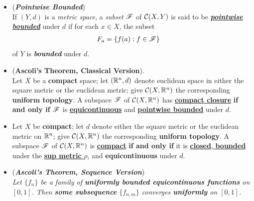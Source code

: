 \documentclass[11pt]{article}
\begin{document}
\begin{itemize}
\item \begin{definition} (\emph{\textbf{Pointwise Bounded}})\\
If $(Y, d)$ is a \emph{metric space}, a \emph{subset} ${\mathscr F}$ of ${\mathcal C}(X, Y)$ is said to be \underline{\emph{\textbf{pointwise bounded}}} under $d$ if for each $x \in X$, the subset
\begin{align*}
F_{a} &= \left\{f(a): f\in {\mathscr F}\right\}
\end{align*}
of $Y$ is \emph{\textbf{bounded}} under $d$.
\end{definition}

\item \begin{theorem} (\textbf{Ascoli's Theorem, Classical Version}). \citep{munkres2000topology}\\
Let $X$ be a \textbf{compact} space; let $({\mathbb R}^n , d)$ denote euclidean space in either the square metric or the euclidean metric; give ${\mathcal C}(X, {\mathbb R}^n)$ the corresponding \textbf{uniform topology}. A subspace ${\mathscr F}$ of ${\mathcal C}(X, {\mathbb R}^n)$ has \underline{\textbf{compact closure}} \textbf{if and only if} ${\mathscr F}$ is \underline{\textbf{equicontinuous}} and \underline{\textbf{pointwise bounded}} under $d$.
\end{theorem}



\item \begin{corollary}
Let $X$  be  \textbf{compact}; let $d$ denote either the square metric or the euclidean metric on ${\mathbb R}^n$; give ${\mathcal C}(X, {\mathbb R}^n)$ the corresponding \textbf{uniform topology}. A subspace ${\mathscr F}$ of ${\mathcal C}(X, {\mathbb R}^n)$ is \underline{\textbf{compact}} \textbf{if and only if} it is \underline{\textbf{closed}, \textbf{bounded}} under the \underline{\textbf{sup metric} $\rho$}, and \textbf{equicontinuous} under $d$.
\end{corollary}

\item \begin{remark} (\textbf{\emph{Ascoli's Theorem, Sequence Version}}) \citep{reed1980methods}\\
\emph{Let $\{f_n\}$ be a family of \textbf{uniformly bounded equicontinuous functions} on $[0, 1]$. Then \textbf{some subsequence} $\{f_{n,m}\}$ converges \textbf{uniformly} on $[0, 1]$.}
\end{remark}
\end{itemize}
\end{document}
